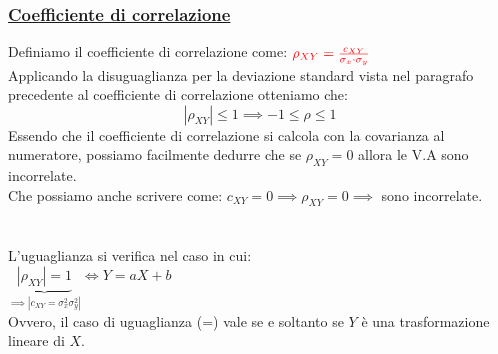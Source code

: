 \documentclass{article}
\begin{document}
\subsubsection{\underline{Coefficiente di correlazione}}
Definiamo il coefficiente di correlazione come: $\color{red} \rho_{XY} = \frac{c_{XY}}{\sigma_x \cdot \sigma_y}$ \\
Applicando la disuguaglianza per la deviazione standard vista nel paragrafo precedente al coefficiente di correlazione otteniamo che:
\[|\rho_{XY}| \leq 1 \implies -1 \leq \rho \leq 1\]
Essendo che il coefficiente di correlazione si calcola con la covarianza al numeratore, possiamo facilmente dedurre che se $\rho_{XY} = 0$ allora le V.A sono incorrelate. \\
Che possiamo anche scrivere come: $c_{XY} = 0 \implies \rho_{XY} = 0 \implies$ sono incorrelate. \\ \\ \\
L'uguaglianza si verifica nel caso in cui: \\
$\underset{\implies |c_{XY} = \sigma_x^2 \sigma_y^2|}{\underbrace{|\rho_{XY}| = 1}} \iff Y = aX + b$ \\
Ovvero, il caso di uguaglianza (=) vale se e soltanto se $Y$ è una trasformazione lineare di $X$.
\end{document}
